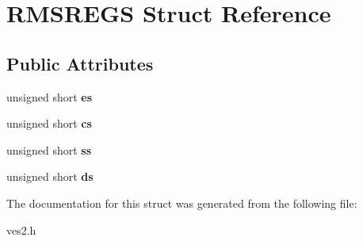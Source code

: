 \section{R\-M\-S\-R\-E\-G\-S Struct Reference}
\label{structRMSREGS}
\subsection*{Public Attributes}
\begin{DoxyCompactItemize}
\item 
unsigned short {\bfseries es}\label{structRMSREGS_abb09ba093c5c89839e1188473b0d6849}

\item 
unsigned short {\bfseries cs}\label{structRMSREGS_a61c429b3adb8d2384024bcea1b3a1047}

\item 
unsigned short {\bfseries ss}\label{structRMSREGS_a66af67043935325479f397a2faa908ca}

\item 
unsigned short {\bfseries ds}\label{structRMSREGS_af5b5b1a55dff2e2ae763a6305b10874b}

\end{DoxyCompactItemize}


The documentation for this struct was generated from the following file\-:\begin{DoxyCompactItemize}
\item 
ves2.\-h\end{DoxyCompactItemize}

